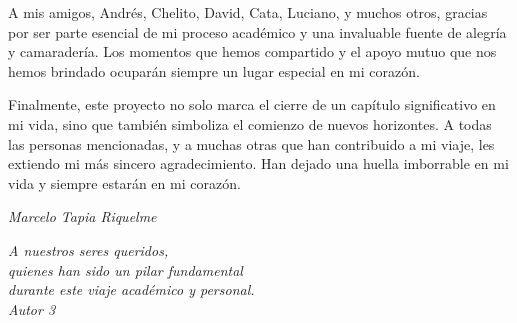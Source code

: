 A mis amigos, Andrés, Chelito, David, Cata, Luciano, y muchos otros, gracias por ser parte esencial de mi proceso académico y una invaluable fuente de alegría y camaradería. Los momentos que hemos compartido y el apoyo mutuo que nos hemos brindado ocuparán siempre un lugar especial en mi corazón.

Finalmente, este proyecto no solo marca el cierre de un capítulo significativo en mi vida, sino que también simboliza el comienzo de nuevos horizontes. A todas las personas mencionadas, y a muchas otras que han contribuido a mi viaje, les extiendo mi más sincero agradecimiento. Han dejado una huella imborrable en mi vida y siempre estarán en mi corazón.

\textit{Marcelo Tapia Riquelme}

\vspace{2cm}

\begin{flushright}
    \textit{A nuestros seres queridos,\\
    quienes han sido un pilar fundamental \\
    durante este viaje académico y personal. \\}
    \textit{Autor 3}
\end{flushright}